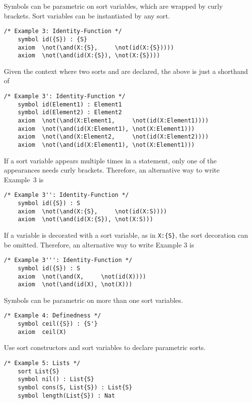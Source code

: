 \documentclass[UTF8,11pt]{article}
\theoremstyle{plain}
\theoremstyle{definition}
\theoremstyle{remark}
\begin{document}
Symbols can be parametric on sort variables, which are wrapped by curly brackets. 
Sort variables can be instantiated by any sort.

\begin{Verbatim}[fontsize=\small]
    /* Example 3: Identity-Function */
    symbol id({S}) : {S}
    axiom  \not(\and(X:{S},     \not(id(X:{S}))))
    axiom  \not(\and(id(X:{S}), \not(X:{S})))
\end{Verbatim}

Given the context where two sorts  and  are declared, the above is just a shorthand of

\begin{Verbatim}[fontsize=\small]
    /* Example 3': Identity-Function */
    symbol id(Element1) : Element1
    symbol id(Element2) : Element2
    axiom  \not(\and(X:Element1,     \not(id(X:Element1))))
    axiom  \not(\and(id(X:Element1), \not(X:Element1)))
    axiom  \not(\and(X:Element2,     \not(id(X:Element2))))
    axiom  \not(\and(id(X:Element1), \not(X:Element1)))
\end{Verbatim}

If a sort variable appears multiple times in a statement, only one of the appearances needs curly brackets.
Therefore, an alternative way to write Example~3 is
\begin{Verbatim}[fontsize=\small]
    /* Example 3'': Identity-Function */
    symbol id({S}) : S
    axiom  \not(\and(X:{S},     \not(id(X:S))))
    axiom  \not(\and(id(X:{S}), \not(X:S)))
\end{Verbatim}

If a variable is decorated with a sort variable, as in {\small\verb|X:{S}|}, the sort decoration can be omitted. Therefore, an alternative way to write Example 3 is
\begin{Verbatim}[fontsize=\small]
    /* Example 3''': Identity-Function */
    symbol id({S}) : S
    axiom  \not(\and(X,     \not(id(X))))
    axiom  \not(\and(id(X), \not(X)))
\end{Verbatim}

Symbols can be parametric on more than one sort variables.
\begin{Verbatim}[fontsize=\small]
    /* Example 4: Definedness */
    symbol ceil({S}) : {S'}
    axiom  ceil(X)
\end{Verbatim}

Use sort constructors and sort variables to declare parametric sorts.
\begin{Verbatim}[fontsize=\small]
    /* Example 5: Lists */
    sort List{S}
    symbol nil() : List{S}
    symbol cons(S, List{S}) : List{S}
    symbol length(List{S}) : Nat
\end{Verbatim}
\end{document}
